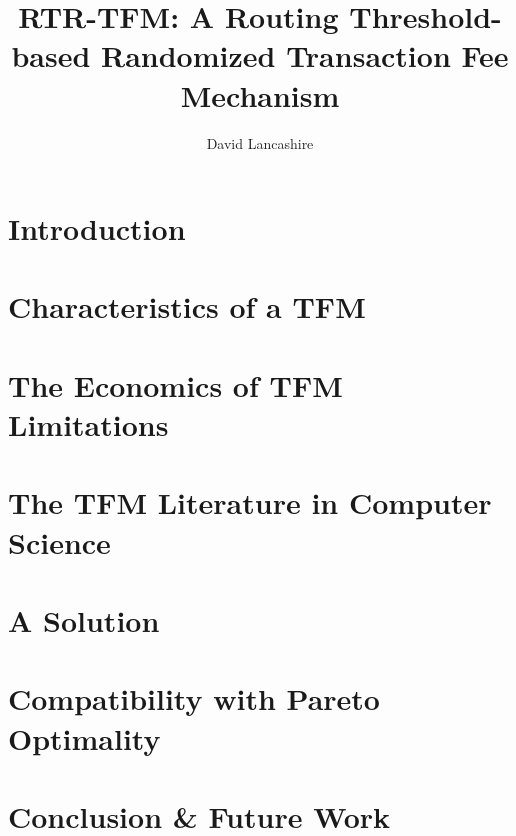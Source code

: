 \documentclass[sigconf,anonymous]{aamas}
\title[Routing Threshold-based Randomized Transaction Fee Mechanism]{RTR-TFM: A Routing Threshold-based Randomized Transaction Fee Mechanism}
\author{David Lancashire}
\affiliation{
  \institution{Proclus Technologies}
  \city{Bangkok}
  \country{Thailand}}
\begin{document}
\pagestyle{fancy}
\fancyhead{}

\maketitle 



\section{Introduction \label{sec::introduction}}


\section{Characteristics of a TFM \label{sec::characteristics}}


\section{The Economics of TFM Limitations \label{sec::economics}}


\section{The TFM Literature in Computer Science \label{sec::distsys}}


\section{A Solution \label{sec::solution}}


\section{Compatibility with Pareto Optimality \label{sec::compatibility}}


\section{Conclusion \& Future Work \label{sec::conclusion}}





\cleardoublepage
 


\end{document}
